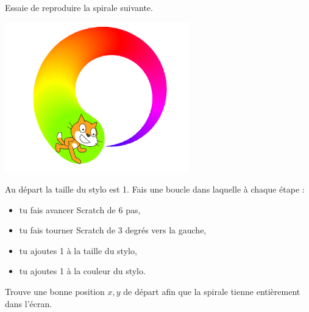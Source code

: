 \documentclass[class=report,crop=false, 12pt]{standalone}
\begin{document}




\bigskip
\bigskip


\begin{activite}

Essaie de reproduire la spirale suivante.

\begin{center}
  \includegraphics[width=0.6\textwidth]{ecran-03-ex1}   
\end{center}

Au départ la taille du stylo est 1.
Fais une boucle dans laquelle à chaque étape :
\begin{itemize}
  \item tu fais avancer Scratch de 6 pas,
  \item tu fais tourner Scratch de 3 degrés vers la gauche,
  \item tu ajoutes 1 à la taille du stylo,
  \item tu ajoutes 1 à la couleur du stylo.
\end{itemize}


Trouve une bonne position $x,y$ de départ afin que la spirale tienne entièrement dans l'écran.



%  
%  
%  

\end{activite}
\end{document}
